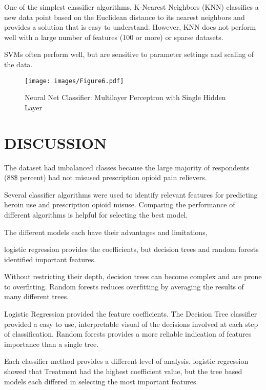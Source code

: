 \documentclass[sigconf]{acmart}
\begin{document}
One of the simplest classifier algorithms, K-Nearest Neighbors (KNN)
classifies a new data point based on the Euclidean distance to its 
nearest neighbors and provides a solution that is easy to understand. 
However, KNN does not perform well with a large number of features 
(100 or more) or sparse datasets.

SVMs often perform well, but are sensitive to parameter settings 
and scaling of the data. 

\begin{figure}[!ht]
  \centering\texttt{[image: images/Figure6.pdf]}
  \caption{Neural Net Classifier: Multilayer Perceptron with Single Hidden Layer}
  \label{f:Figur6}
\end{figure}




\section{DISCUSSION}


The dataset had imbalanced classes because the large majority of respondents 
(88\$ percent) had not misused prescription opioid pain relievers. 


Several classifier algorithms were used to identify relevant features for 
predicting heroin use and prescription opioid misuse. Comparing the performance 
of different algorithms is helpful for  selecting the best model. 

The different models each have their advantages and limitations, 

logistic regression provides the coefficients, but decision trees and 
random forests identified important features.

Without restricting their depth, decision trees can become complex and are 
prone to overfitting. Random forests reduces overfitting by averaging the results of many different
trees.

Logistic Regression provided the feature coefficients. 
The Decision Tree classifier provided a easy to use, interpretable visual of
the decisions involved at each step of classification. Random forests provides
a more reliable indication of features importance than a single tree. 

Each classifier method provides a different level of analysis. 
logistic regression showed that Treatment had the highest coefficient value, but 
the tree based models each differed in selecting the most important features. 
\end{document}
